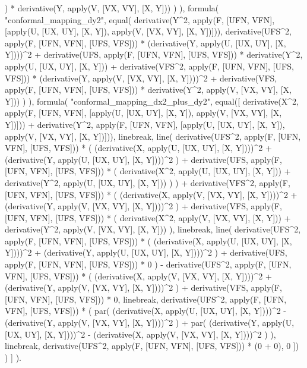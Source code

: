 \begin{prolog}
					) * derivative(Y, apply(V, [VX, VY], [X, Y]))
				)
			),
			formula(
				"conformal_mapping_dy2",
				equal(
					derivative(Y^2, apply(F, [UFN, VFN], [apply(U, [UX, UY], [X, Y]), apply(V, [VX, VY], [X, Y])])),
					derivative(UFS^2, apply(F, [UFN, VFN], [UFS, VFS])) * (derivative(Y, apply(U, [UX, UY], [X, Y])))^2 +
					derivative(UFS, apply(F, [UFN, VFN], [UFS, VFS])) * derivative(Y^2, apply(U, [UX, UY], [X, Y])) +
					derivative(VFS^2, apply(F, [UFN, VFN], [UFS, VFS])) * (derivative(Y, apply(V, [VX, VY], [X, Y])))^2 +
					derivative(VFS, apply(F, [UFN, VFN], [UFS, VFS])) * derivative(Y^2, apply(V, [VX, VY], [X, Y]))
				)
			),
			formula(
				"conformal_mapping_dx2_plus_dy2",
				equal([
					derivative(X^2, apply(F, [UFN, VFN], [apply(U, [UX, UY], [X, Y]), apply(V, [VX, VY], [X, Y])])) +
					derivative(Y^2, apply(F, [UFN, VFN], [apply(U, [UX, UY], [X, Y]), apply(V, [VX, VY], [X, Y])])),
					linebreak,
					line(
						derivative(UFS^2, apply(F, [UFN, VFN], [UFS, VFS])) * (
							(derivative(X, apply(U, [UX, UY], [X, Y])))^2 +
							(derivative(Y, apply(U, [UX, UY], [X, Y])))^2
						) +
						derivative(UFS, apply(F, [UFN, VFN], [UFS, VFS])) * (
							derivative(X^2, apply(U, [UX, UY], [X, Y])) +
							derivative(Y^2, apply(U, [UX, UY], [X, Y]))
						)
					) +
					derivative(VFS^2, apply(F, [UFN, VFN], [UFS, VFS])) * (
						(derivative(X, apply(V, [VX, VY], [X, Y])))^2 +
						(derivative(Y, apply(V, [VX, VY], [X, Y])))^2
					) +
					derivative(VFS, apply(F, [UFN, VFN], [UFS, VFS])) * (
						derivative(X^2, apply(V, [VX, VY], [X, Y])) + 
						derivative(Y^2, apply(V, [VX, VY], [X, Y]))
					),
					linebreak,
					line(
						derivative(UFS^2, apply(F, [UFN, VFN], [UFS, VFS])) * (
							(derivative(X, apply(U, [UX, UY], [X, Y])))^2 +
							(derivative(Y, apply(U, [UX, UY], [X, Y])))^2
						) +
						derivative(UFS, apply(F, [UFN, VFN], [UFS, VFS])) * 0
					) -
					derivative(UFS^2, apply(F, [UFN, VFN], [UFS, VFS])) * (
						(derivative(X, apply(V, [VX, VY], [X, Y])))^2 +
						(derivative(Y, apply(V, [VX, VY], [X, Y])))^2
					) +
					derivative(VFS, apply(F, [UFN, VFN], [UFS, VFS])) * 0,
					linebreak,
					derivative(UFS^2, apply(F, [UFN, VFN], [UFS, VFS])) * (
						par(
							(derivative(X, apply(U, [UX, UY], [X, Y])))^2 -
							(derivative(Y, apply(V, [VX, VY], [X, Y])))^2
						)
						+
						par(
							(derivative(Y, apply(U, [UX, UY], [X, Y])))^2 -
							(derivative(X, apply(V, [VX, VY], [X, Y])))^2
						)
					),
					linebreak,
					derivative(UFS^2, apply(F, [UFN, VFN], [UFS, VFS])) * (0 + 0),
					0
				])
			)
		]
	).
\end{prolog}


